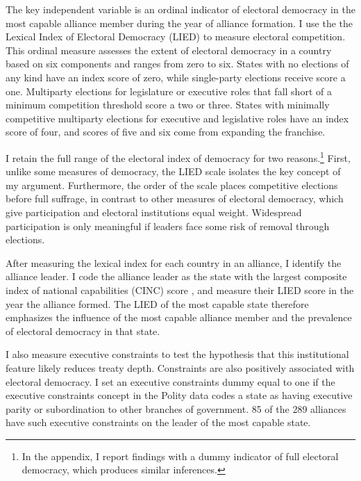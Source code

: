 \documentclass[12pt]{article}
\begin{document}
The key independent variable is an ordinal indicator of electoral democracy in the most capable alliance member during the year of alliance formation. 
I use the the Lexical Index of Electoral Democracy (LIED) \citep{Skaaningetal2015} to measure electoral competition.
This ordinal measure assesses the extent of electoral democracy in a country based on six components and ranges from zero to six.  
States with no elections of any kind have an index score of zero, while single-party elections receive score a one. 
Multiparty elections for legislature or executive roles that fall short of a minimum competition threshold score a two or three. 
States with minimally competitive multiparty elections for executive and legislative roles have an index score of four, and scores of five and six come from expanding the franchise.

I retain the full range of the electoral index of democracy for two reasons.\footnote{In the appendix, I report findings with a dummy indicator of full electoral democracy, which produces similar inferences.}
First, unlike some measures of democracy, the LIED scale isolates the key concept of my argument.
Furthermore, the order of the scale places competitive elections before full suffrage, in contrast to other measures of electoral democracy, which give participation and electoral institutions equal weight. 
Widespread participation is only meaningful if leaders face some risk of removal through elections.


After measuring the lexical index for each country in an alliance, I identify the alliance leader.   
I code the alliance leader as the state with the largest composite index of national capabilities (CINC) score \citep{SingerCINC1988}, and measure their LIED score in the year the alliance formed.
The LIED of the most capable state therefore emphasizes the influence of the most capable alliance member and the prevalence of electoral democracy in that state.


I also measure executive constraints to test the hypothesis that this institutional feature likely reduces treaty depth. 
Constraints are also positively associated with electoral democracy.
I set an executive constraints dummy equal to one if the executive constraints concept in the Polity data codes a state as having executive parity or subordination to other branches of government.
85 of the 289 alliances have such executive constraints on the leader of the most capable state.
\end{document}
